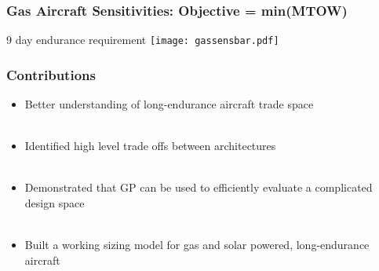 \documentclass{beamer}
\begin{document}
\begin{frame}
    \frametitle{Gas Aircraft Sensitivities: Objective = min(MTOW)}
    
    \pause
    
    \begin{center}
        \scriptsize
        9 day endurance requirement
    \texttt{[image: gassensbar.pdf]} 
    \end{center}

\end{frame}

\begin{frame}
    \frametitle{Contributions}

    \begin{itemize}
        \pause
        \item Better understanding of long-endurance aircraft trade space \\~\\
        \pause
        \item Identified high level trade offs between architectures \\~\\
        \pause
        \item Demonstrated that GP can be used to efficiently evaluate a complicated design space \\~\\
            \pause
        \item Built a working sizing model for gas and solar powered, long-endurance aircraft
        \end{itemize}

\end{frame}
\end{document}
